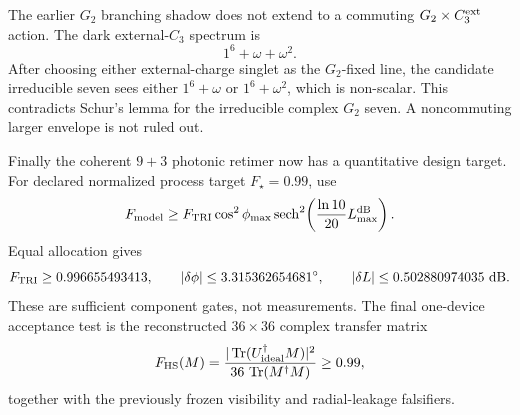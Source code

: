 The earlier $G_2$ branching shadow does not extend to a commuting
$G_2\times C_3^{\rm ext}$ action.  The dark external-$C_3$ spectrum is
\[
 1^6+\omega+\omega^2.
\]
After choosing either external-charge singlet as the $G_2$-fixed line, the
candidate irreducible seven sees either $1^6+\omega$ or
$1^6+\omega^2$, which is non-scalar.  This contradicts Schur's lemma for the
irreducible complex $G_2$ seven.  A noncommuting larger envelope is not ruled
out.

Finally the coherent $9+3$ photonic retimer now has a quantitative design
target.  For declared normalized process target $F_\star=0.99$, use
\[
 F_{\rm model}\ge
 F_{\rm TRI}\cos^2\phi_{\max}\,
 {\rm sech}^2\!\left({\ln10\over20}L_{\max}^{\rm dB}\right).
\]
Equal allocation gives
\[
 F_{\rm TRI}\ge0.996655493413,\qquad
 |\delta\phi|\le3.315362654681^\circ,\qquad
 |\delta L|\le0.502880974035\ {\rm dB}.
\]
These are sufficient component gates, not measurements.  The final one-device
acceptance test is the reconstructed $36\times36$ complex transfer matrix
\[
 F_{\rm HS}(M)=
 {|\operatorname{Tr}(U_{\rm ideal}^{\dagger}M)|^2
  \over36\,\operatorname{Tr}(M^\dagger M)}
 \ge0.99,
\]
together with the previously frozen visibility and radial-leakage falsifiers.
